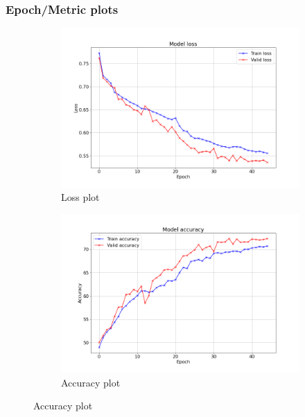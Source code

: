 \documentclass{beamer}
\begin{document}
\begin{frame}
\frametitle{Epoch/Metric plots}

\begin{figure}
    \centering
    \begin{subfigure}[b]{0.49\textwidth}
        \includegraphics[width=\textwidth]{images/loss.png}
        \caption*{Loss plot}
    \end{subfigure}
    \begin{subfigure}[b]{0.49\textwidth}
        \includegraphics[width=\textwidth]{images/accuracy.png}
        \caption*{Accuracy plot}
    \end{subfigure}
\end{figure}
	
\end{frame}

\end{document}
